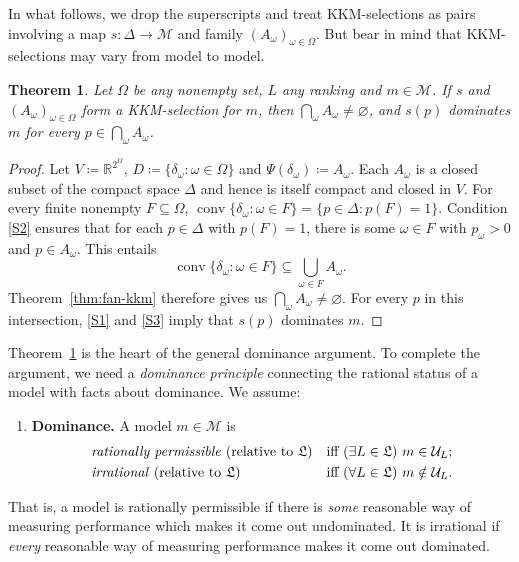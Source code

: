\documentclass[11pt]{article}
\newtheorem{theorem}{Theorem}[section]
\theoremstyle{definition}
\theoremstyle{remark}
\newcommand{\M}{\mathcal M}
\newcommand{\U}{\mathcal U}
\newcommand{\Lf}{\mathfrak L}
\begin{document}
In what follows, we drop the superscripts and treat KKM-selections as pairs involving a map $s:\Delta\to\M$ and family $(A_\omega)_{\omega\in\Omega}$. But bear in mind that KKM-selections may vary from model to model. 


\begin{theorem}\label{thm:selection}
Let $\Omega$ be any nonempty set, $L$ any ranking and $m\in\M$. If $s$ and $(A_\omega)_{\omega\in\Omega}$ form a KKM-selection for $m$, then $\bigcap_\omega A_\omega\ne\varnothing$, and $s(p)$ dominates $m$ for every $p\in\bigcap_\omega A_\omega$.
\end{theorem}
\begin{proof}
Let $V\coloneqq\mathbb R^{2^\Omega}$, $D\coloneqq\{\delta_\omega:\omega\in\Omega\}$ and $\Psi(\delta_\omega)\coloneqq A_\omega$. Each $A_\omega$ is a closed subset of the compact space $\Delta$ and hence is itself compact and closed in $V$. For every finite nonempty $F\subseteq\Omega$, $\operatorname{conv}\{\delta_\omega:\omega\in F\}=\{p\in\Delta:p(F)=1\}$. Condition \ref{S2} ensures that for each $p\in\Delta$ with $p(F)=1$, there is some $\omega\in F$ with $p_\omega>0$ and $p\in A_\omega$. This entails
\[
\operatorname{conv}\{\delta_\omega:\omega\in F\}
\subseteq\bigcup_{\omega\in F}A_\omega.
\]
Theorem~\ref{thm:fan-kkm} therefore gives us $\bigcap_\omega A_\omega\ne\varnothing$. For every $p$ in this intersection, \ref{S1} and \ref{S3} imply that $s(p)$ dominates $m$.
\end{proof}



Theorem~\ref{thm:selection} is the heart of the general dominance argument. To complete the argument, we need a \textit{dominance principle} connecting the rational status of a model with facts about dominance. We assume:
\begin{enumerate}[label=\textbf{(D)},leftmargin=*]
\item\label{principle:dominance} \textbf{Dominance.} A model $m\in\M$ is
\begin{align*}
&\text{\emph{rationally permissible} (relative to $\Lf$)}&&\text{iff }(\exists L\in\Lf)\ m\in\U_L;\\
&\text{\emph{irrational} (relative to $\Lf$)}&&\text{iff }(\forall L\in\Lf)\ m\notin\U_L.
\end{align*}
\end{enumerate}
That is, a model is rationally permissible if there is \textit{some} reasonable way of measuring performance which makes it come out undominated. It is irrational if \textit{every} reasonable way of measuring performance makes it come out dominated.
\end{document}

